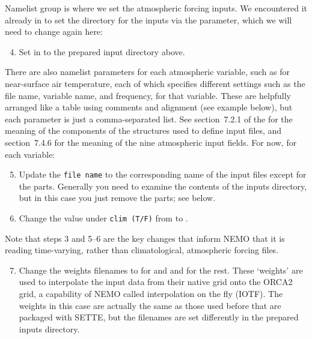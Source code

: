Namelist group  is where we set the atmospheric forcing inputs.
We encountered it already in  to set the directory for the inputs via the  parameter, which we will need to change again here:
\begin{enumerate}\setcounter{enumi}{3}
    \item Set  in  to the prepared input directory above.
\end{enumerate}
There are also namelist parameters for each atmospheric variable, such as  for near-surface air temperature, each of which specifies different settings such as the file name, variable name, and frequency, for that variable.
These are helpfully arranged like a table using comments and alignment (see example below), but each  parameter is just a comma-separated list.
See section~\mbox{7.2.1} of the  for the meaning of the components of the structures used to define input files, and section~\mbox{7.4.6} for the meaning of the nine atmospheric input fields.
For now, for each variable:

\begin{enumerate}\setcounter{enumi}{4}
    \item Update the \texttt{file name} to the corresponding name of the input files except for the  parts.
        Generally you need to examine the contents of the inputs directory, but in this case you just remove the  parts; see below.
    \item Change the value under \texttt{clim (T/F)} from \nmltrue{} to \nmlfalse{}.
\end{enumerate}

Note that steps 3 and \mbox{5--6} are the key changes that inform NEMO that it is reading time-varying, rather than climatological, atmospheric forcing files.

\begin{enumerate}\setcounter{enumi}{6}
    \item Change the weights filenames to  for  and  and  for the rest.
        These `weights' are used to interpolate the input data from their native grid onto the ORCA2 grid, a capability of NEMO called interpolation on the fly (IOTF).
        The weights in this case are actually the same as those used before that are packaged with SETTE, but the filenames are set differently in the prepared inputs directory.
\end{enumerate}

